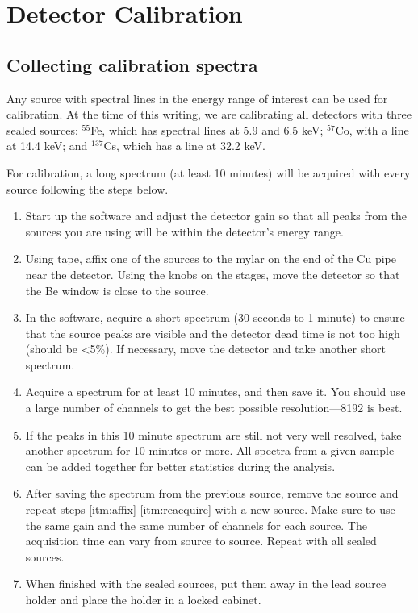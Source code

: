 \chapter{Detector Calibration\label{chap:calib}}

\section{Collecting calibration spectra}

Any source with spectral lines in the energy range of interest can be
used for calibration. At the time of this writing, we are calibrating
all detectors with three sealed sources: $^{55}$Fe, which has spectral
lines at 5.9 and 6.5 keV; $^{57}$Co, with a line at 14.4 keV; and
$^{137}$Cs, which has a line at 32.2 keV.

For calibration, a long spectrum (at least 10 minutes) will be
acquired with every source following the steps below.
\begin{enumerate}
\item Start up the software and adjust the detector gain so that all
  peaks from the sources you are using will be within the detector's
  energy range.
\item \label{itm:affix} Using tape, affix one of the sources to the
  mylar on the end of the Cu pipe near the detector. Using the knobs
  on the stages, move the detector so that the Be window is close to
  the source.
\item In the software, acquire a short spectrum (30 seconds to 1
  minute) to ensure that the source peaks are visible and the detector
  dead time is not too high (should be <5\%). If necessary, move the
  detector and take another short spectrum.
\item \label{itm:acquire} Acquire a spectrum for at least 10 minutes,
  and then save it. You should use a large number of channels to get
  the best possible resolution---8192 is best.
\item \label{itm:reacquire} If the peaks in this 10 minute spectrum
  are still not very well resolved, take another spectrum for 10
  minutes or more. All spectra from a given sample can be added
  together for better statistics during the analysis.
\item After saving the spectrum from the previous source, remove the
  source and repeat steps \ref{itm:affix}-\ref{itm:reacquire} with a new
  source. Make sure to use the same gain and the same number of
  channels for each source. The acquisition time can vary from source
  to source. Repeat with all sealed sources.
\item When finished with the sealed sources, put them away in the lead
  source holder and place the holder in a locked cabinet.
\end{enumerate}
  
